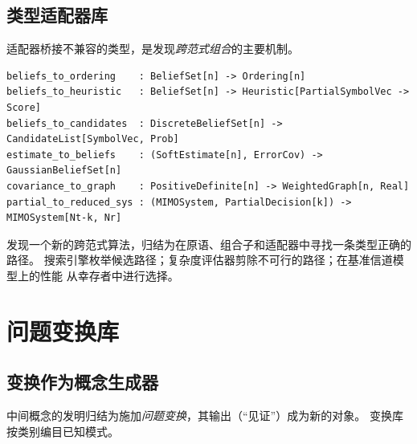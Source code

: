 \documentclass[12pt,a4paper]{article}
\begin{document}
\subsection{类型适配器库}

适配器桥接不兼容的类型，是发现\emph{跨范式组合}的主要机制。

\vspace{0.3em}
\begin{lstlisting}[style=dsl, caption={桥接概率置信度与搜索控制的关键适配器}]
beliefs_to_ordering    : BeliefSet[n] -> Ordering[n]
beliefs_to_heuristic   : BeliefSet[n] -> Heuristic[PartialSymbolVec -> Score]
beliefs_to_candidates  : DiscreteBeliefSet[n] -> CandidateList[SymbolVec, Prob]
estimate_to_beliefs    : (SoftEstimate[n], ErrorCov) -> GaussianBeliefSet[n]
covariance_to_graph    : PositiveDefinite[n] -> WeightedGraph[n, Real]
partial_to_reduced_sys : (MIMOSystem, PartialDecision[k]) -> MIMOSystem[Nt-k, Nr]
\end{lstlisting}

\noindent
发现一个新的跨范式算法，归结为在原语、组合子和适配器中寻找一条类型正确的路径。
搜索引擎枚举候选路径；复杂度评估器剪除不可行的路径；在基准信道模型上的性能
从幸存者中进行选择。

\section{问题变换库}
\label{sec:transform}

\subsection{变换作为概念生成器}

中间概念的发明归结为施加\emph{问题变换}，其输出（``见证''）成为新的对象。
变换库按类别编目已知模式。
\end{document}

